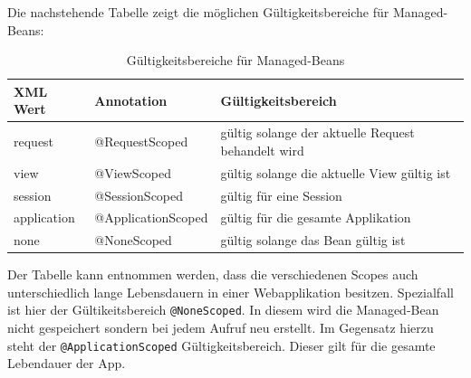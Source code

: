 \documentclass[12pt, twoside, a4paper, ngerman]{article}
\begin{document}
Die nachstehende Tabelle zeigt die möglichen Gültigkeitsbereiche für Managed-Beans:

\begin{table}[H]
\begin{center}
	\begin{tabular}{|l|l|l||}\hline
		\textbf{XML Wert} & \textbf{Annotation} & \textbf{Gültigkeitsbereich} \\ \hline	
		request & @RequestScoped & gültig solange der aktuelle Request behandelt wird\\ \hline \hline
		view & @ViewScoped & gültig solange die aktuelle View gültig ist\\ \hline \hline
		session & @SessionScoped & gültig für eine Session\\ \hline \hline
		application & @ApplicationScoped & gültig für die gesamte Applikation\\ \hline \hline
		none & @NoneScoped & gültig solange das Bean gültig ist\\ \hline \hline
	\end{tabular}
	\caption{Gültigkeitsbereiche für Managed-Beans}
	\label{tab:Scopes}
\end{center}
\end{table}

Der Tabelle kann entnommen werden, dass die verschiedenen Scopes auch unterschiedlich lange Lebensdauern in einer Webapplikation besitzen.
Spezialfall ist hier der Gültikeitsbereich \texttt{@NoneScoped}. In diesem wird die Managed-Bean nicht gespeichert sondern bei jedem Aufruf neu erstellt.
Im Gegensatz hierzu steht der \texttt{@ApplicationScoped} Gültigkeitsbereich. Dieser gilt für die gesamte Lebendauer der App.
\end{document}
